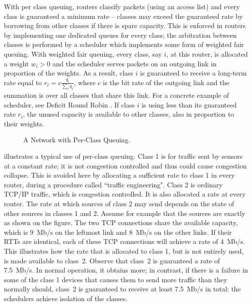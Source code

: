 With  per class queuing, routers classify packets (using an access list) and every class is guaranteed a minimum rate -- classes may exceed the guaranteed rate by borrowing from other  classes if there is spare capacity.
This is enforced in routers by implementing one dedicated queues for every class; the arbitration between classes is performed by a scheduler which implements some form of weighted fair queuing. With weighted fair queuing, every class, say $i$, at this router, is allocated a weight $w_i>0$ and the scheduler serves packets on an outgoing link in proportion of the weights. As a result, class $i$ is guaranteed to receive a long-term rate equal to $r_i=c \frac{q_i}{\sum_i q_j}$, where $c$ is the bit rate of the outgoing link and the summation is over all classes that share this link. For a concrete example of scheduler, see Deficit Round Robin \cite{shreedhar1996efficient}. If class $i$ is using less than its guaranteed rate $r_i$, the unused capacity is available to other
classes, also in proportion to their weights.

\begin{figure}[h]
  \caption{A Network with Per-Class Queuing.}\label{fig-cbq}
\end{figure}


 illustrates a typical use of per-class queuing. Class 1 is for traffic sent by sensors at a constant rate; it is not congestion controlled and thus could cause congestion collapse. This is avoided here by allocating a sufficient rate to class 1 in every router, during a procedure called ``traffic engineering". Class 2 is ordinary TCP/IP traffic, which is congestion controlled. It is also allocated a rate at every router. The rate at which sources of class 2 may send depends on the state of other sources in classes 1 and 2. Assume for example that the sources are exactly as shown on the figure. The two TCP connections share the available capacity, which is 9~Mb/s on the leftmost link and 8~Mb/s on the other links. If their RTTs are identical, each of these TCP connections will achieve a rate of 4~Mb/s. This illustrates how the rate that is allocated to class 1, but is not entirely used, is made available to class~2. Observe that class~2 is guaranteed a rate of 7.5~Mb/s. In normal operation, it obtains more; in contrast, if there is a failure in some of the class 1 devices that causes them to send more traffic than they normally should, class~2 is guaranteed to receive at least 7.5~Mb/s in total: the schedulers achieve isolation of the classes.
